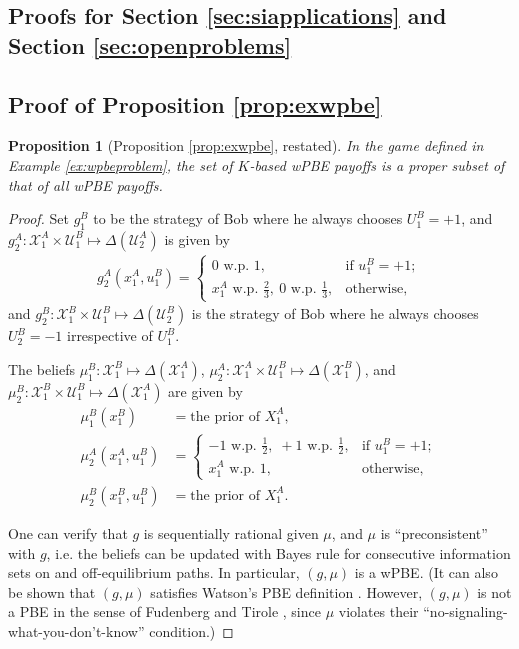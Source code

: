 \documentclass[pdflatex,sn-basic]{sn-jnl}
\newcommand{\Comp}{K}
\theoremstyle{thmstyleone}%
\newtheorem{prop}{Proposition}
\theoremstyle{thmstyletwo}%
\theoremstyle{thmstylethree}%
\begin{document}
\begin{appendices}
\section{Proofs for Section \ref{sec:siapplications} and Section \ref{sec:openproblems}}\label{app:siapplications}
\subsection{Proof of Proposition \ref{prop:exwpbe}}\label{app:prop:exwpbe}
\begin{prop}[Proposition \ref{prop:exwpbe}, restated]
		In the game defined in Example \ref{ex:wpbeproblem}, the set of $\Comp$-based wPBE payoffs is a proper subset of that of all wPBE payoffs.
	\end{prop}

\begin{proof}
    Set $g_1^B$ to be the strategy of Bob where he always chooses $U_1^B=+1$, and $g_2^A: \mathcal{X}_1^A \times \mathcal{U}_1^B\mapsto \Delta(\mathcal{U}_2^A)$ is given by
	\begin{align*}
		g_2^A(x_1^A, u_1^B) = \begin{cases}
			0\text{ w.p. }1,&\text{if }u_1^B=+1;\\
			x_1^A\text{ w.p. }\frac{2}{3},~ 0 \text{ w.p. }\frac{1}{3},&\text{otherwise},
		\end{cases}
	\end{align*}
	and $g_2^B: \mathcal{X}_{1}^B\times \mathcal{U}_1^B \mapsto \Delta(\mathcal{U}_2^B)$ is the strategy of Bob where he always chooses $U_2^B=-1$ irrespective of $U_1^B$.
	
	The beliefs $\mu_1^B: \mathcal{X}_{1}^{B} \mapsto \Delta(\mathcal{X}_{1}^{A})$, $\mu_2^A: \mathcal{X}_1^A \times \mathcal{U}_1^B \mapsto \Delta(\mathcal{X}_{1}^B)$, and $\mu_2^B:\mathcal{X}_{1}^B \times \mathcal{U}_1^B \mapsto \Delta(\mathcal{X}_1^A)$ are given by
	\begin{align*}
		\mu_1^B(x_1^B) &= \text{the prior of }X_1^{A},\\
		\mu_2^A(x_1^A, u_1^B) &= \begin{cases}
			-1 \text{ w.p. }\frac{1}{2},\;+1 \text{ w.p. }\frac{1}{2},&\text{if }u_1^B=+1;\\
			x_1^A \text{ w.p. }1,&\text{otherwise},
		\end{cases}\\
		\mu_2^B(x_{1}^B, u_1^B) &= \text{the prior of }X_1^{A}.
	\end{align*}
	
	One can verify that $g$ is sequentially rational given $\mu$, and $\mu$ is ``preconsistent'' \citep{hendon1996one} with $g$, i.e. the beliefs can be updated with Bayes rule for consecutive information sets on and off-equilibrium paths. In particular, $(g, \mu)$ is a wPBE. (It can also be shown that $(g, \mu)$ satisfies Watson's {PBE definition \citep{watson2017general}}. However, $(g, \mu)$ is not a PBE in the sense of Fudenberg and Tirole \citep{fudenberg1991perfect}, since $\mu$ violates their ``no-signaling-what-you-don't-know'' condition.)
 

\end{proof}
\end{appendices}
\end{document}
